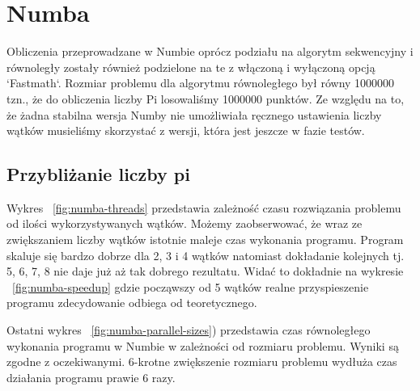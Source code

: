 \section{Numba}
Obliczenia przeprowadzane w Numbie oprócz podziału na algorytm sekwencyjny i równoległy
zostały również podzielone na te z włączoną i wyłączoną  opcją `Fastmath`.
Rozmiar problemu dla algorytmu równoległego był równy 1000000 tzn., że do obliczenia
liczby Pi losowaliśmy 1000000 punktów.
Ze względu na to, że żadna stabilna wersja Numby nie umożliwiała ręcznego ustawienia
liczby wątków musieliśmy skorzystać z wersji, która jest jeszcze w fazie testów.


\subsection{Przybliżanie liczby pi}

\begin{figure*}
    \centering
    \begin{minipage}[b]{.45\textwidth}
        \centering
        
        \caption{Przyspieszenie liczenia liczby $\pi$ w Numbie}
        \label{fig:numba-speedup}
    \end{minipage}
    \hfill
    \begin{minipage}[b]{.45\textwidth}
        \centering
        
        \caption{Czas wykonania algorytmu w Numbie w zależności od liczby wątków}
        \label{fig:numba-threads}
    \end{minipage}
\end{figure*}

\begin{figure*}
    \centering
    
    \caption{Czas równoległego wykonania algorytmu w Numbie w zależności od rozmiaru problemu}
    \label{fig:numba-parallel-sizes}
\end{figure*}

Wykres ~\ref{fig:numba-threads} przedstawia zależność czasu rozwiązania problemu
od ilości wykorzystywanych
wątków.
Możemy zaobserwować, że wraz ze zwiększaniem liczby wątków istotnie maleje czas
wykonania programu.
Program skaluje się bardzo dobrze dla 2, 3 i 4 wątków natomiast
dokładanie kolejnych tj. 5, 6, 7, 8 nie daje już aż tak dobrego rezultatu.
Widać to dokładnie
na wykresie ~\ref{fig:numba-speedup} gdzie począwszy od 5 wątków realne przyspieszenie
programu zdecydowanie odbiega od teoretycznego.

Ostatni wykres ~\ref{fig:numba-parallel-sizes}) przedstawia czas równoległego wykonania
programu w Numbie w zależności od rozmiaru problemu. Wyniki są zgodne z oczekiwanymi.
6-krotne zwiększenie rozmiaru problemu wydłuża czas działania programu prawie 6 razy.

